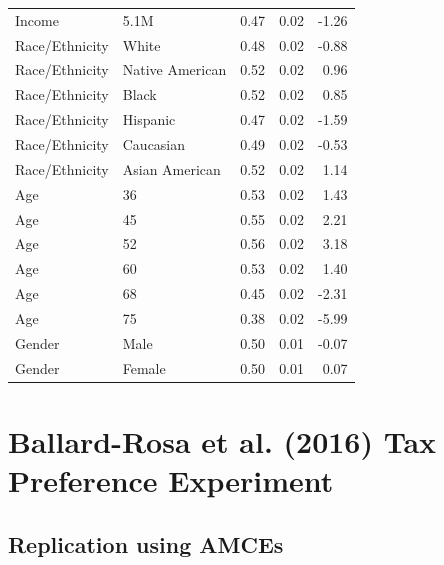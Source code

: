 \documentclass[a4paper,12pt]{article}\usepackage[]{graphicx}\usepackage[]{color}
\begin{document}
\begin{table}[ht]
\begin{tabular}{lp{3in}rrr}
  Income & 5.1M & 0.47 & 0.02 & -1.26 \\ 
  Race/Ethnicity & White & 0.48 & 0.02 & -0.88 \\ 
  Race/Ethnicity & Native American & 0.52 & 0.02 & 0.96 \\ 
  Race/Ethnicity & Black & 0.52 & 0.02 & 0.85 \\ 
  Race/Ethnicity & Hispanic & 0.47 & 0.02 & -1.59 \\ 
  Race/Ethnicity & Caucasian & 0.49 & 0.02 & -0.53 \\ 
  Race/Ethnicity & Asian American & 0.52 & 0.02 & 1.14 \\ 
  Age & 36 & 0.53 & 0.02 & 1.43 \\ 
  Age & 45 & 0.55 & 0.02 & 2.21 \\ 
  Age & 52 & 0.56 & 0.02 & 3.18 \\ 
  Age & 60 & 0.53 & 0.02 & 1.40 \\ 
  Age & 68 & 0.45 & 0.02 & -2.31 \\ 
  Age & 75 & 0.38 & 0.02 & -5.99 \\ 
  Gender & Male & 0.50 & 0.01 & -0.07 \\ 
  Gender & Female & 0.50 & 0.01 & 0.07 \\ 
   \hline
\end{tabular}
\endgroup
\end{table}


\clearpage

\section{Ballard-Rosa et al. (2016) Tax Preference Experiment}

\subsection{Replication using AMCEs}
\end{document}

